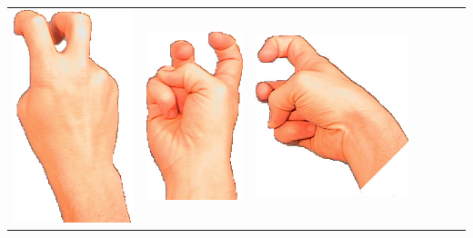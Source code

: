 \documentclass{article}
\begin{document}
\begin{center}
\begin{tabular}{r*{6}{c}}
\includegraphics[scale=0.1]{images/02-02-3.jpg}&
\includegraphics[scale=0.1]{images/02-02-4.jpg}&
\includegraphics[scale=0.1]{images/02-02-5.jpg}&

\end{tabular}
\end{center}
\end{document}
